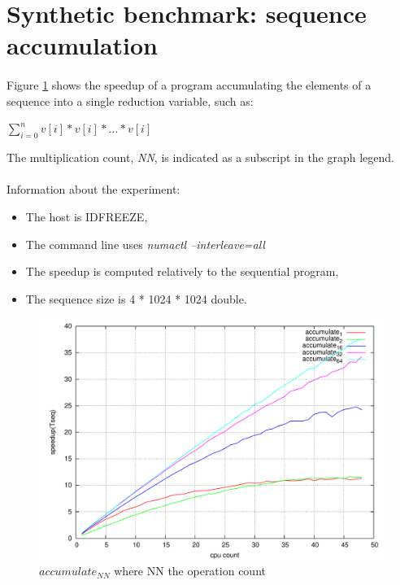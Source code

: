 \documentclass[a4paper, 11pt]{article}
\begin{document}
\newpage
\section{Synthetic benchmark: sequence accumulation}

\paragraph{}
Figure \ref{accumulate_large} shows the speedup of a program accumulating the
elements of a sequence into a single reduction variable, such as:
\begin{center}
  $\sum_{i=0}^n v[i] * v[i] * ... * v[i]$
\end{center}
The multiplication count, \textit{NN}, is indicated as a subscript in the graph legend.

\paragraph{}
Information about the experiment:
\begin{itemize}
\item The host is IDFREEZE,
\item The command line uses \textit{numactl --interleave=all}
\item The speedup is computed relatively to the sequential program,
\item The sequence size is 4 * 1024 * 1024 double.
\end{itemize}

\begin{figure}[!ht]
\centering
\includegraphics[keepaspectratio=true, width=\linewidth]{../graphs/accumulate_large_sequence_speedups.pdf}
\caption{$accumulate_{NN}$ where NN the operation count}
\label{accumulate_large}
\end{figure}
\end{document}
